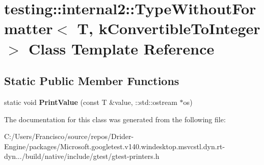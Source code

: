 \hypertarget{classtesting_1_1internal2_1_1_type_without_formatter_3_01_t_00_01k_convertible_to_integer_01_4}{}\section{testing\+:\+:internal2\+:\+:Type\+Without\+Formatter$<$ T, k\+Convertible\+To\+Integer $>$ Class Template Reference}
\label{classtesting_1_1internal2_1_1_type_without_formatter_3_01_t_00_01k_convertible_to_integer_01_4}
\subsection*{Static Public Member Functions}
\begin{DoxyCompactItemize}
\item 
\mbox{\label{classtesting_1_1internal2_1_1_type_without_formatter_3_01_t_00_01k_convertible_to_integer_01_4_ab27a411afb608e730a57d232b3f4f486}} 
static void {\bfseries Print\+Value} (const T \&value, \+::std\+::ostream $\ast$os)
\end{DoxyCompactItemize}


The documentation for this class was generated from the following file\+:\begin{DoxyCompactItemize}
\item 
C\+:/\+Users/\+Francisco/source/repos/\+Drider-\/\+Engine/packages/\+Microsoft.\+googletest.\+v140.\+windesktop.\+msvcstl.\+dyn.\+rt-\/dyn.../build/native/include/gtest/gtest-\/printers.\+h\end{DoxyCompactItemize}
